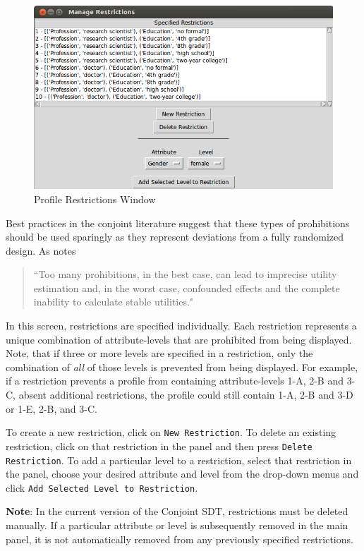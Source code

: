 \documentclass[12pt]{article}
\begin{document}
\begin{figure}[ht!]
\centering\includegraphics[scale=.6]{graphics/restriction_screen.png}
\caption{Profile Restrictions Window}
\end{figure}

Best practices in the conjoint literature suggest that these types of prohibitions should be used sparingly as they represent deviations from a fully randomized design. As \cite{Orme2002} notes 
\begin{quote} 
``Too many prohibitions, in the best case, can lead to imprecise utility estimation and, in the worst case, confounded effects and the complete inability to calculate stable utilities."
\end{quote}

In this screen, restrictions are specified individually. Each restriction represents a unique combination of attribute-levels that are prohibited from being displayed. Note, that if three or more levels are specified in a restriction, only the combination of \emph{all} of those levels is prevented from being displayed. For example, if a restriction prevents a profile from containing attribute-levels 1-A, 2-B and 3-C, absent additional restrictions, the profile could still contain 1-A, 2-B and 3-D or 1-E, 2-B, and 3-C.   

To create a new restriction, click on \texttt{New Restriction}. To delete an existing restriction, click on that restriction in the panel and then press \texttt{Delete Restriction}. To add a particular level to a restriction, select that restriction in the panel, choose your desired attribute and level from the drop-down menus and click \texttt{Add Selected Level to Restriction}.

\textbf{Note}: In the current version of the Conjoint SDT, restrictions must be deleted manually. If a particular attribute or level is subsequently removed in the main panel, it is not automatically removed from any previously specified restrictions.
\end{document}
